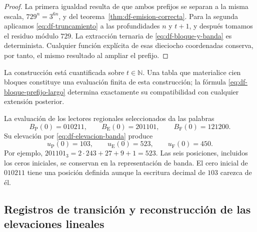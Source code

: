 \begin{proof}
La primera igualdad resulta de que ambos prefijos se separan a la misma
escala, \(729^n=3^{6n}\), y del
teorema~\ref{thm:df-emision-correcta}. Para la segunda aplicamos
\eqref{eq:df-truncamiento} a las profundidades \(n\) y \(t+1\), y después
tomamos el residuo módulo \(729\). La extracción ternaria de
\eqref{eq:df-bloque-y-banda} es determinista. Cualquier función explícita
de esas dieciocho coordenadas conserva, por tanto, el mismo resultado al
ampliar el prefijo.
\end{proof}

La construcción está cuantificada sobre \(t\in\mathbb N\). Una tabla que
materialice cien bloques constituye una evaluación finita de esta
construcción; la fórmula \eqref{eq:df-bloque-prefijo-largo} determina
exactamente su compatibilidad con cualquier extensión posterior.

\begin{example}
La evaluación de los lectores regionales seleccionados da las palabras
\[
 B_{\mathrm P}(0)=010211,\qquad
 B_{\mathrm E}(0)=201101,\qquad
 B_{\mathrm F}(0)=121200.
\]
Su elevación por \eqref{eq:df-elevacion-banda} produce
\[
 u_{\mathrm P}(0)=103,\qquad
 u_{\mathrm E}(0)=523,\qquad
 u_{\mathrm F}(0)=450.
\]
Por ejemplo,
\(201101_3=2\cdot243+27+9+1=523\).
Las seis posiciones, incluidos los ceros iniciales, se conservan en la
representación de banda. El cero inicial de \(010211\) tiene una posición
definida aunque la escritura decimal de \(103\) carezca de él.
\end{example}

\subsection{Registros de transición y reconstrucción de las elevaciones lineales}
\label{subsec:df-registros-transicion}


